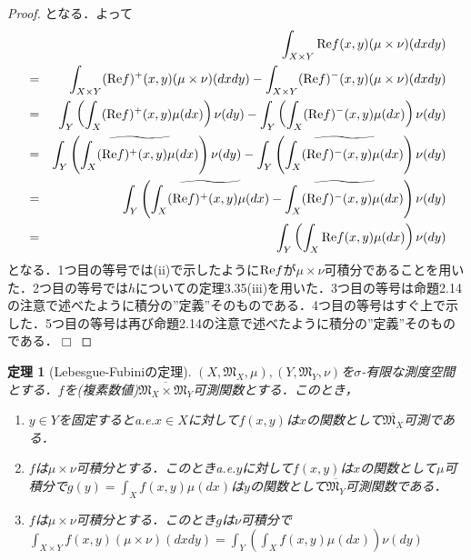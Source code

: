 \documentclass[a4paper,11pt]{jsarticle}
\newtheorem{theorem}[definition]{定理}
\newtheorem{proof}{証明}
\def\qed{\hfill $\Box$}
\begin{document}
\begin{proof}
となる．よって
\begin{eqnarray*}
&&\int_{X\times Y}{\rm Re}f(x,y)(\mu\times\nu)(dxdy) \\
&=&\int_{X\times Y}({\rm Re}f)^+(x,y)(\mu\times\nu)(dxdy)-\int_{X\times Y}({\rm Re}f)^-(x,y)(\mu\times\nu)(dxdy) \\
&=&\int_Y\left(\int_X({\rm Re}f)^+(x,y)\mu(dx)\right)\nu(dy)-\int_Y\left(\int_X({\rm Re}f)^-(x,y)\mu(dx)\right)\nu(dy) \\
&=&\int_Y\left(\widetilde{\int_X({\rm Re}f)^+(x,y)\mu(dx)}\right)\nu(dy)-\int_Y\left(\widetilde{\int_X({\rm Re}f)^-(x,y)\mu(dx)}\right)\nu(dy) \\
&=&\int_Y\left(\widetilde{\int_X({\rm Re}f)^+(x,y)\mu(dx)}-\widetilde{\int_X({\rm Re}f)^-(x,y)\mu(dx)}\right)\nu(dy) \\
&=&\int_Y\left(\int_X{\rm Re}f(x,y)\mu(dx)\right)\nu(dy)
\end{eqnarray*}
となる．1つ目の等号では(ii)で示したように${\rm Re}f$が$\mu\times\nu$可積分であることを用いた．2つ目の等号では$h$についての定理3.35(iii)を用いた．3つ目の等号は命題2.14の注意で述べたように積分の''定義''そのものである．4つ目の等号はすぐ上で示した．5つ目の等号は再び命題2.14の注意で述べたように積分の''定義''そのものである．\qed
\end{proof}
%
%
%
\begin{theorem}[Lebesgue-Fubiniの定理]
$(X,\mathfrak{M}_X,\mu ),(Y,\mathfrak{M}_Y,\nu )$を$\sigma$-有限な測度空間とする．$f$を(複素数値)$\overline{\mathfrak{M}_X\times\mathfrak{M}_Y}$可測関数とする．このとき，
\begin{enumerate}
\renewcommand{\labelenumi}{(\roman{enumi})}
\item $y\in Y$を固定するとa.e.$x\in X$に対して$f(x,y)$は$x$の関数として$\overline{\mathfrak{M}_X}$可測である．
\item $f$は$\mu\times\nu$可積分とする．このときa.e.$y$に対して$f(x,y)$は$x$の関数として$\mu$可積分で$g(y)=\int_Xf(x,y)\mu(dx)$は$y$の関数として$\overline{\mathfrak{M}_Y}$可測関数である．
\item $f$は$\mu\times\nu$可積分とする．このとき$g$は$\nu$可積分で$\int_{X\times Y}f(x,y)(\mu\times\nu)(dxdy)=\int_Y\left(\int_Xf(x,y)\mu(dx)\right)\nu(dy)$
\end{enumerate}
\end{theorem}
\end{document}
